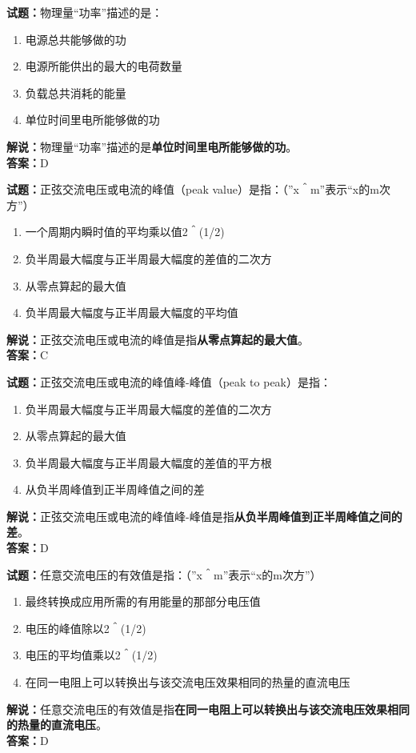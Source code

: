 \documentclass{ctexbook}
\begin{document}
\bigskip


\noindent\textbf{试题：}物理量“功率”描述的是：
\begin{enumerate}[leftmargin=3em]
\item 电源总共能够做的功
\item 电源所能供出的最大的电荷数量
\item 负载总共消耗的能量
\item 单位时间里电所能够做的功
\end{enumerate}
\noindent\textbf{解说：}物理量“功率”描述的是\textbf{单位时间里电所能够做的功}。\\\noindent\textbf{答案：}D



\bigskip


\noindent\textbf{试题：}正弦交流电压或电流的峰值（peak value）是指：（”x＾m”表示“x的m次方”）
\begin{enumerate}[leftmargin=3em]
\item 一个周期内瞬时值的平均乘以值2＾(1/2)
\item 负半周最大幅度与正半周最大幅度的差值的二次方
\item 从零点算起的最大值
\item 负半周最大幅度与正半周最大幅度的平均值
\end{enumerate}
\noindent\textbf{解说：}正弦交流电压或电流的峰值是指\textbf{从零点算起的最大值}。\\\noindent\textbf{答案：}C


\bigskip


\noindent\textbf{试题：}正弦交流电压或电流的峰值峰-峰值（peak to peak）是指：
\begin{enumerate}[leftmargin=3em]
\item 负半周最大幅度与正半周最大幅度的差值的二次方
\item 从零点算起的最大值
\item 负半周最大幅度与正半周最大幅度的差值的平方根
\item 从负半周峰值到正半周峰值之间的差
\end{enumerate}
\noindent\textbf{解说：}正弦交流电压或电流的峰值峰-峰值是指\textbf{从负半周峰值到正半周峰值之间的差}。\\\noindent\textbf{答案：}D



\bigskip


\noindent\textbf{试题：}任意交流电压的有效值是指：（”x＾m”表示“x的m次方”）
\begin{enumerate}[leftmargin=3em]
\item 最终转换成应用所需的有用能量的那部分电压值
\item 电压的峰值除以2＾(1/2)
\item 电压的平均值乘以2＾(1/2)
\item 在同一电阻上可以转换出与该交流电压效果相同的热量的直流电压
\end{enumerate}
\noindent\textbf{解说：}任意交流电压的有效值是指\textbf{在同一电阻上可以转换出与该交流电压效果相同的热量的直流电压}。\\\noindent\textbf{答案：}D
\end{document}
